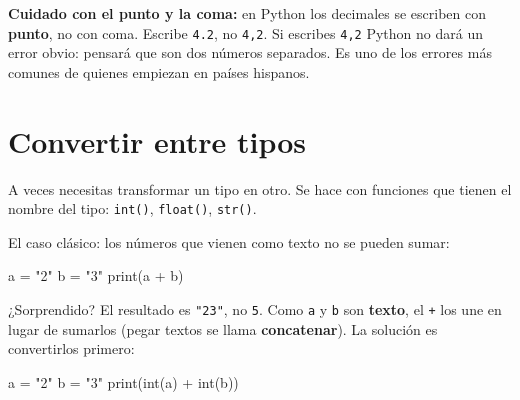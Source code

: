 \documentclass[
  spanish,
  letterpaper,
  DIV=11,
  numbers=noendperiod]{scrreprt}
\newenvironment{Shaded}{\begin{snugshade}}{\end{snugshade}}
\newcommand{\BuiltInTok}[1]{\textcolor[rgb]{0.00,0.23,0.31}{#1}}
\newcommand{\NormalTok}[1]{\textcolor[rgb]{0.00,0.23,0.31}{#1}}
\newcommand{\OperatorTok}[1]{\textcolor[rgb]{0.37,0.37,0.37}{#1}}
\newcommand{\StringTok}[1]{\textcolor[rgb]{0.13,0.47,0.30}{#1}}
\begin{document}
\begin{tcolorbox}[enhanced jigsaw, arc=.35mm, bottomrule=.15mm, bottomtitle=1mm, breakable, colback=white, colbacktitle=quarto-callout-warning-color!10!white, colframe=quarto-callout-warning-color-frame, coltitle=black, left=2mm, leftrule=.75mm, opacityback=0, opacitybacktitle=0.6, rightrule=.15mm, title=\textcolor{quarto-callout-warning-color}{\faExclamationTriangle}\hspace{0.5em}{Advertencia}, titlerule=0mm, toprule=.15mm, toptitle=1mm]

\textbf{Cuidado con el punto y la coma:} en Python los decimales se
escriben con \textbf{punto}, no con coma. Escribe \texttt{4.2}, no
\texttt{4,2}. Si escribes \texttt{4,2} Python no dará un error obvio:
pensará que son dos números separados. Es uno de los errores más comunes
de quienes empiezan en países hispanos.

\end{tcolorbox}

\section{Convertir entre tipos}\label{convertir-entre-tipos}

A veces necesitas transformar un tipo en otro. Se hace con funciones que
tienen el nombre del tipo: \texttt{int()}, \texttt{float()},
\texttt{str()}.

El caso clásico: los números que vienen como texto no se pueden sumar:

\begin{Shaded}
\begin{Highlighting}[]
\NormalTok{a }\OperatorTok{=} \StringTok{"2"}
\NormalTok{b }\OperatorTok{=} \StringTok{"3"}
\BuiltInTok{print}\NormalTok{(a }\OperatorTok{+}\NormalTok{ b)}
\end{Highlighting}
\end{Shaded}

¿Sorprendido? El resultado es \texttt{"23"}, no \texttt{5}. Como
\texttt{a} y \texttt{b} son \textbf{texto}, el \texttt{+} los une en
lugar de sumarlos (pegar textos se llama \textbf{concatenar}). La
solución es convertirlos primero:

\begin{Shaded}
\begin{Highlighting}[]
\NormalTok{a }\OperatorTok{=} \StringTok{"2"}
\NormalTok{b }\OperatorTok{=} \StringTok{"3"}
\BuiltInTok{print}\NormalTok{(}\BuiltInTok{int}\NormalTok{(a) }\OperatorTok{+} \BuiltInTok{int}\NormalTok{(b))}
\end{Highlighting}
\end{Shaded}
\end{document}
